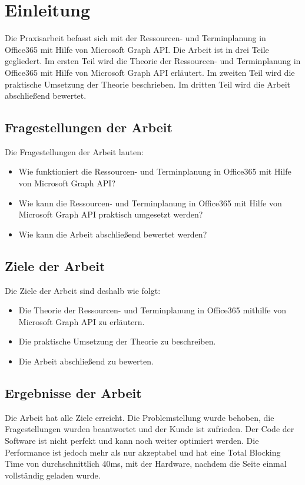 


\section{Einleitung}
Die Praxisarbeit befasst sich mit der Ressourcen- und Terminplanung in Office365 mit Hilfe von Microsoft Graph API. Die Arbeit ist in drei Teile gegliedert. Im ersten Teil wird die Theorie der Ressourcen- und Terminplanung in Office365 mit Hilfe von Microsoft Graph API erläutert. Im zweiten Teil wird die praktische Umsetzung der Theorie beschrieben. Im dritten Teil wird die Arbeit abschließend bewertet.
    \newline
    \subsection{Fragestellungen der Arbeit}
    Die Fragestellungen der Arbeit lauten:
    \begin{itemize}
        \item Wie funktioniert die Ressourcen- und Terminplanung in Office365 mit Hilfe von Microsoft Graph API?
        \item Wie kann die Ressourcen- und Terminplanung in Office365 mit Hilfe von Microsoft Graph API praktisch umgesetzt werden?
        \item Wie kann die Arbeit abschließend bewertet werden?
    \end{itemize}
    \subsection{Ziele der Arbeit}
    Die Ziele der Arbeit sind deshalb wie folgt:
    \begin{itemize}
        \item Die Theorie der Ressourcen- und Terminplanung in Office365 mithilfe von Microsoft Graph API zu erläutern.
        \item Die praktische Umsetzung der Theorie zu beschreiben.
        \item Die Arbeit abschließend zu bewerten.
    \end{itemize}
    \subsection{Ergebnisse der Arbeit}
    Die Arbeit hat alle Ziele erreicht.
    Die Problemstellung wurde behoben, die Fragestellungen wurden beantwortet und der Kunde ist zufrieden.
    Der Code der Software ist nicht perfekt und kann noch weiter optimiert werden.
    Die Performance ist jedoch mehr als nur akzeptabel und hat eine Total Blocking Time von durchschnittlich 40ms, mit der Hardware, nachdem die Seite einmal vollständig geladen wurde.
\newpage

